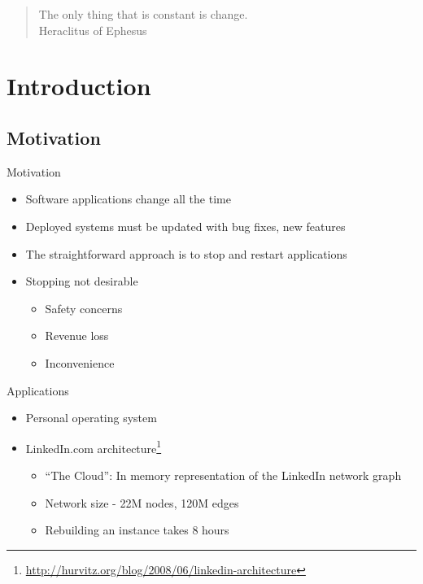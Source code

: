
{
\begin{frame}
\begin{block}{}
\begin{quote}
The only thing that is constant is change.\\
\hfill Heraclitus of Ephesus
\end{quote}
\end{block}
\end{frame}
}

\section{Introduction}
\subsection{Motivation}
\begin{frame}{Motivation}%
\begin{itemize}
\item Software applications change all the time
\item Deployed systems must be updated with bug fixes, new features
\item The straightforward approach is to stop and restart applications
\item Stopping not desirable
  \begin{itemize}
  \item Safety concerns
  \item Revenue loss
  \item Inconvenience
  \end{itemize}
\end{itemize}
\end{frame}

\begin{frame}{Applications}%
\begin{itemize}
\item Personal operating system
\item LinkedIn.com architecture\footnote{\scriptsize{\url{http://hurvitz.org/blog/2008/06/linkedin-architecture}}}
  \begin{itemize}
  \item ``The Cloud'': In memory representation of the LinkedIn network graph
  \item Network size - 22M nodes, 120M edges
  \item Rebuilding an instance takes 8 hours
  \end{itemize}
\end{itemize}
\end{frame}


